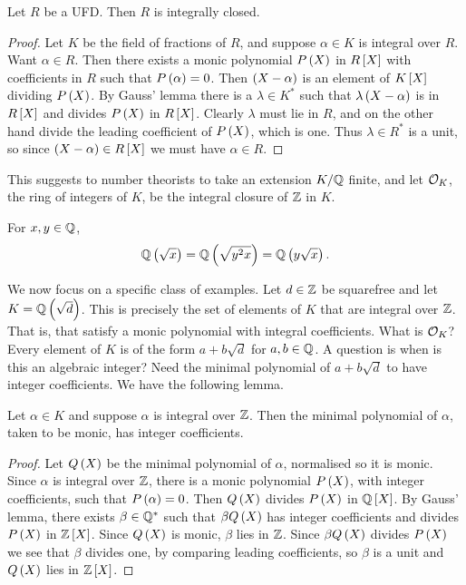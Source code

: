 \pagebreak

\begin{theorem}
Let $ R $ be a UFD. Then $ R $ is integrally closed.
\end{theorem}

\begin{proof}
Let $ K $ be the field of fractions of $ R $, and suppose $ \alpha \in K $ is integral over $ R $. Want $ \alpha \in R $. Then there exists a monic polynomial $ P\br{X} $ in $ R\sbr{X} $ with coefficients in $ R $ such that $ P\br{\alpha} = 0 $. Then $ \br{X - \alpha} $ is an element of $ K\sbr{X} $ dividing $ P\br{X} $. By Gauss' lemma there is a $ \lambda \in K^* $ such that $ \lambda\br{X - \alpha} $ is in $ R\sbr{X} $ and divides $ P\br{X} $ in $ R\sbr{X} $. Clearly $ \lambda $ must lie in $ R $, and on the other hand divide the leading coefficient of $ P\br{X} $, which is one. Thus $ \lambda \in R^* $ is a unit, so since $ \br{X - \alpha} \in R\sbr{X} $ we must have $ \alpha \in R $.
\end{proof}

This suggests to number theorists to take an extension $ K / \mathbb{Q} $ finite, and let $ \mathcal{O}_K $, the ring of integers of $ K $, be the integral closure of $ \mathbb{Z} $ in $ K $.

\begin{note*}
For $ x, y \in \mathbb{Q} $,
$$ \Q\br{\sqrt{x}} = \Q\br{\sqrt{y^2x}} = \Q\br{y\sqrt{x}}. $$
\end{note*}

We now focus on a specific class of examples. Let $ d \in \mathbb{Z} $ be squarefree and let $ K = \Q\br{\sqrt{d}} $. This is precisely the set of elements of $ K $ that are integral over $ \mathbb{Z} $. That is, that satisfy a monic polynomial with integral coefficients. What is $ \mathcal{O}_K $? Every element of $ K $ is of the form $ a + b\sqrt{d} $ for $ a, b \in \mathbb{Q} $. A question is when is this an algebraic integer? Need the minimal polynomial of $ a + b\sqrt{d} $ to have integer coefficients. We have the following lemma.

\begin{lemma}
Let $ \alpha \in K $ and suppose $ \alpha $ is integral over $ \mathbb{Z} $. Then the minimal polynomial of $ \alpha $, taken to be monic, has integer coefficients.
\end{lemma}

\begin{proof}
Let $ Q\br{X} $ be the minimal polynomial of $ \alpha $, normalised so it is monic. Since $ \alpha $ is integral over $ \mathbb{Z} $, there is a monic polynomial $ P\br{X} $, with integer coefficients, such that $ P\br{\alpha} = 0 $. Then $ Q\br{X} $ divides $ P\br{X} $ in $ \Q\sbr{X} $. By Gauss' lemma, there exists $ \beta \in \mathbb{Q}^* $ such that $ \beta Q\br{X} $ has integer coefficients and divides $ P\br{X} $ in $ \Z\sbr{X} $. Since $ Q\br{X} $ is monic, $ \beta $ lies in $ \mathbb{Z} $. Since $ \beta Q\br{X} $ divides $ P\br{X} $ we see that $ \beta $ divides one, by comparing leading coefficients, so $ \beta $ is a unit and $ Q\br{X} $ lies in $ \Z\sbr{X} $.
\end{proof}

